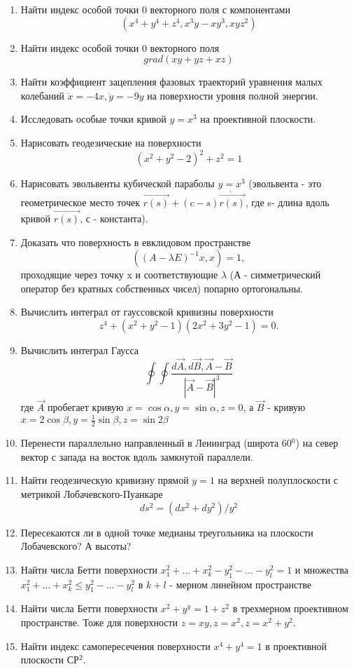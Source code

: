 \documentclass{article}
\begin{document}
\begin{enumerate}
\item Найти индекс особой точки 0 векторного поля с компонентами $$(x^{4}+y^{4}+z^{4}, x^{3}y-xy^{3}, xyz^{2})$$
\item Найти индекс особой точки 0 векторного поля $$ grad(xy+yz+xz)$$
\item Найти коэффициент зацепления фазовых траекторий уравнения малых колебаний $\ddot{x}=-4x,\ddot{y}=-9y$ на поверхности уровня полной энергии.
\item Исследовать особые точки кривой $y=x^{3}$ на проективной плоскости.
\item Нарисовать геодезические на поверхности $$(x^{2}+y^{2}-2)^{2}+z^{2}=1$$
\item Нарисовать эвольвенты кубической параболы $y=x^{3}$ (эвольвента - это геометрическое место точек $\vec{r(s)}+(c-s)\dot{\vec{r(s)}}$, где s- длина вдоль кривой $\vec{r(s)}$, $с$ - константа).
\item Доказать что поверхность в евклидовом пространстве $$((A-\lambda E)^{-1}x,x)=1,$$ проходящие через точку x и соответствующие $\lambda$ (А - симметрический оператор без кратных собственных чисел) попарно ортогональны.
\item Вычислить интеграл от гауссовской кривизны поверхности $$z^{4}+(x^{2}+y^{2}-1)(2x^{2}+3y^{2}-1)=0.$$
\item Вычислить интеграл Гаусса $$\oint\oint\frac{d\vec{A}, d\vec{B},\vec{A}-\vec{B}}{|\vec{A}-\vec{B}|^{3}}$$ где $\vec{A}$ пробегает кривую $x=\cos\alpha, y=\sin\alpha, z=0$, а $\vec{B}$ - кривую $x=2\cos\beta, y=\frac{1}{2}\sin\beta, z=\sin2\beta$
\item Перенести параллельно направленный в Ленинград (широта 60$^{0}$) на север вектор с запада на восток вдоль замкнутой параллели.
\item Найти геодезическую кривизну прямой $y=1$ на верхней полуплоскости с метрикой Лобачевского-Пуанкаре $$ ds^{2}=(dx^{2}+dy^{2})/y^{2}$$
\item Пересекаются ли в одной точке медианы треугольника на плоскости Лобачевского? А высоты?
\item Найти числа Бетти поверхности $x_{1}^{2}+...+x_{k}^{2}-y_{1}^{2}- ...-y_{l}^{2}=1$ и множества$x_{1}^{2}+...+x_{k}^{2}\leq y_{1}^{2}- ...-y_{l}^{2}$ в $k+l$ - мерном линейном пространстве
\item Найти числа Бетти поверхности $ x^{2}+y^{y}=1+z^{2}$ в трехмерном проективном пространстве. Тоже для поверхности $z=xy,z=x^{2}, z=x^{2}+y^{2}.$
\item Найти индекс самопересечения поверхности $x^{4}+y^{4}=1$ в проективной плоскости СР$^{2}$.

\end{enumerate}
\end{document}
